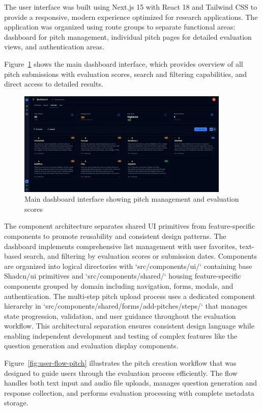The user interface was built using Next.js 15 with React 18 and Tailwind CSS to provide a responsive, modern experience optimized for research applications. The application was organized using route groups to separate functional areas: dashboard for pitch management, individual pitch pages for detailed evaluation views, and authentication areas.

Figure~\ref{fig:dashboard} shows the main dashboard interface, which provides overview of all pitch submissions with evaluation scores, search and filtering capabilities, and direct access to detailed results.

\begin{figure}[H]
  \centering
  \includegraphics[width=0.9\textwidth]{img/dashboard}
\caption{Main dashboard interface showing pitch management and evaluation scores}
  \label{fig:dashboard}
\end{figure}

The component architecture separates shared UI primitives from feature-specific components to promote reusability and consistent design patterns. The dashboard implements comprehensive list management with user favorites, text-based search, and filtering by evaluation scores or submission dates. Components are organized into logical directories with `src/components/ui/` containing base Shadcn/ui primitives and `src/components/shared/` housing feature-specific components grouped by domain including navigation, forms, modals, and authentication. The multi-step pitch upload process uses a dedicated component hierarchy in `src/components/shared/forms/add-pitches/steps/` that manages state progression, validation, and user guidance throughout the evaluation workflow. This architectural separation ensures consistent design language while enabling independent development and testing of complex features like the question generation and evaluation display components.

Figure~\ref{fig:user-flow-pitch} illustrates the pitch creation workflow that was designed to guide users through the evaluation process efficiently. The flow handles both text input and audio file uploads, manages question generation and response collection, and performs evaluation processing with complete metadata storage.


